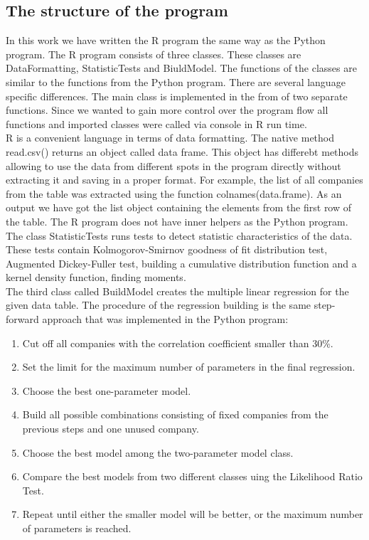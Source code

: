 \documentclass[
  twoside,
  12pt, a4paper,
  footinclude=true,
  headinclude=true,
  cleardoublepage=empty
]{article}
\begin{document}
\subsection{The structure of the program}
In this work we have written the R program the same way as the Python program. The R program consists of three classes. These classes are DataFormatting, StatisticTests and BiuldModel. The functions of the classes  are similar to the functions from the Python program. There are several language specific differences. The main class is implemented in the from of two separate functions. Since we wanted to gain more control over the program flow all functions and imported classes were called via console in R run time.\\
R is a convenient language in terms of data formatting. The native method read.csv() returns an object called data frame. This object has differebt methods allowing to use the data from different spots in the program directly without extracting it and saving in a proper format. For example, the list of all companies from the table was extracted using the function colnames(data.frame). As an output we have got the list object containing the elements from the first row of the table. The R program does not have inner helpers as the Python program.\\
The class StatisticTests runs tests to detect statistic characteristics of the data. These tests contain Kolmogorov-Smirnov goodness of fit distribution test, Augmented Dickey-Fuller test, building a cumulative distribution function and a kernel density function, finding moments.\\
The third class called BuildModel creates the multiple linear regression for  the given data table. The procedure of the regression building is the same step-forward approach that was implemented in the Python program:
\begin{enumerate}
    \item Cut off all companies with the correlation coefficient smaller than 30\%.
    \item Set the limit for the maximum number of parameters in the final regression. 
    \item Choose the best one-parameter model.
    \item Build all possible combinations consisting of fixed companies from the previous steps and one unused company.
    \item Choose the best model among the two-parameter model class.
    \item Compare the best models from two different classes uing the Likelihood Ratio Test.
    \item Repeat until either the smaller model will be better, or the maximum number of parameters is reached.
\end{enumerate}
\end{document}
